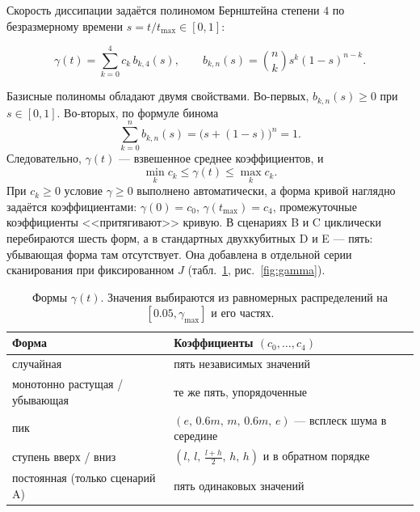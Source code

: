 \documentclass[12pt,a4paper]{report}
\numberwithin{equation}{chapter}
\begin{document}
Скорость диссипации задаётся полиномом Бернштейна степени $4$ по
безразмерному времени $s=t/t_{\max}\in[0,1]$:
\begin{keybox}
\begin{equation}
\gamma(t)=\sum_{k=0}^{4}c_k\,b_{k,4}(s),\qquad
b_{k,n}(s)=\binom nk s^k(1-s)^{n-k}.
\label{eq:bernstein}
\end{equation}
\end{keybox}
Базисные полиномы обладают двумя свойствами. Во-первых, $b_{k,n}(s)\ge0$ при
$s\in[0,1]$. Во-вторых, по формуле бинома
\[
\sum_{k=0}^nb_{k,n}(s)=\bigl(s+(1-s)\bigr)^n=1 .
\]
Следовательно, $\gamma(t)$ --- взвешенное среднее коэффициентов, и
\begin{equation}
\min_kc_k\le\gamma(t)\le\max_kc_k .
\end{equation}
При $c_k\ge0$ условие $\gamma\ge0$ выполнено автоматически, а форма кривой
наглядно задаётся коэффициентами: $\gamma(0)=c_0$, $\gamma(t_{\max})=c_4$,
промежуточные коэффициенты <<притягивают>> кривую. В сценариях B и C
циклически перебираются шесть форм, а в стандартных двухкубитных D и E ---
пять: убывающая форма там отсутствует. Она добавлена в отдельной серии
сканирования при фиксированном $J$ (табл.~\ref{tab:shapes},
рис.~\ref{fig:gamma}).

\begin{table}[h]
\centering
\caption{Формы $\gamma(t)$. Значения выбираются из равномерных распределений
на $[0.05,\gamma_{\max}]$ и его частях.}
\label{tab:shapes}
\small
\begin{tabular}{@{}ll@{}}
\toprule
Форма & Коэффициенты $(c_0,\dots,c_4)$ \\
\midrule
случайная & пять независимых значений \\
монотонно растущая / убывающая & те же пять, упорядоченные \\
пик & $(e,\,0.6m,\,m,\,0.6m,\,e)$ --- всплеск шума в середине \\
ступень вверх / вниз & $(l,\,l,\,\tfrac{l+h}2,\,h,\,h)$ и в обратном порядке \\
постоянная (только сценарий A) & пять одинаковых значений \\
\bottomrule
\end{tabular}
\end{table}
\end{document}
